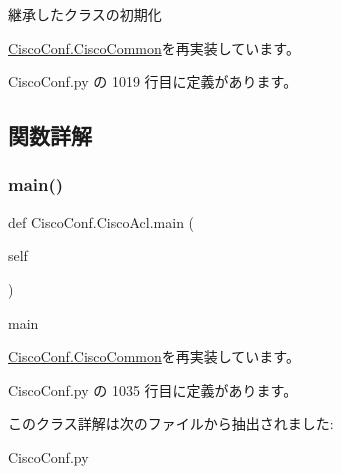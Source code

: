 \begin{DoxyVerb}継承したクラスの初期化
\end{DoxyVerb}
 

\mbox{\hyperlink{classCiscoConf_1_1CiscoCommon_a67ee86ca701af50e95bed0abfcd09dda}{Cisco\+Conf.\+Cisco\+Common}}を再実装しています。



 Cisco\+Conf.\+py の 1019 行目に定義があります。



\subsection{関数詳解}
\mbox{\label{classCiscoConf_1_1CiscoAcl_a3865990e7ffb488c97717b01f8a37fb8}} 
\subsubsection{\texorpdfstring{main()}{main()}}
{\footnotesize\ttfamily def Cisco\+Conf.\+Cisco\+Acl.\+main (\begin{DoxyParamCaption}\item[{}]{self }\end{DoxyParamCaption})}

\begin{DoxyVerb}main
\end{DoxyVerb}
 

\mbox{\hyperlink{classCiscoConf_1_1CiscoCommon_a1bfe0207baec9f926f5dbea8c0f9e503}{Cisco\+Conf.\+Cisco\+Common}}を再実装しています。



 Cisco\+Conf.\+py の 1035 行目に定義があります。



このクラス詳解は次のファイルから抽出されました\+:\begin{DoxyCompactItemize}
\item 
Cisco\+Conf.\+py\end{DoxyCompactItemize}
